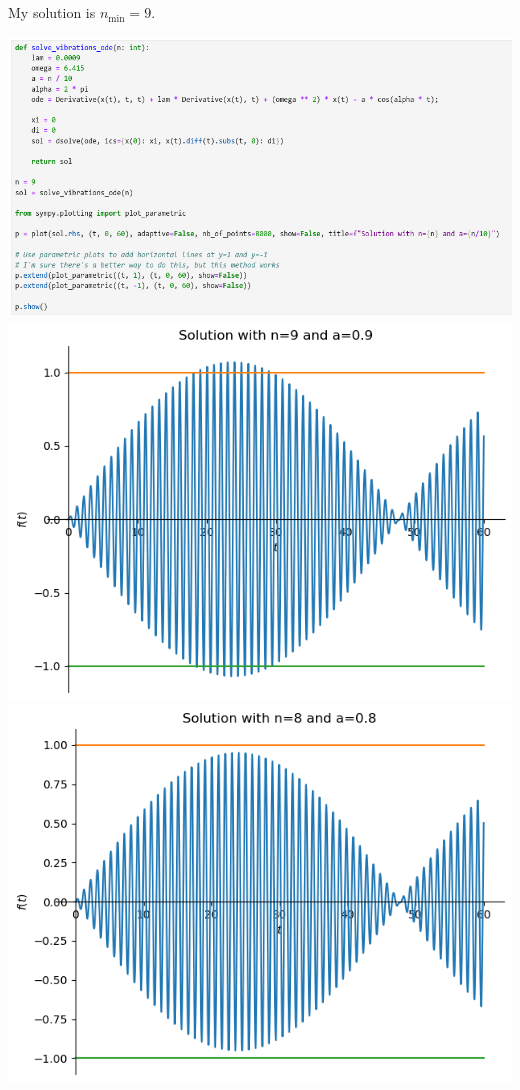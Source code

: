 \documentclass[a4paper]{article}
\begin{document}
\subsection{~}

My solution is $n_\text{min} = 9$.

\includegraphics[scale=0.45]{Q3-b}
\includegraphics[scale=0.8]{n9}
\includegraphics[scale=0.8]{n8}
\end{document}
